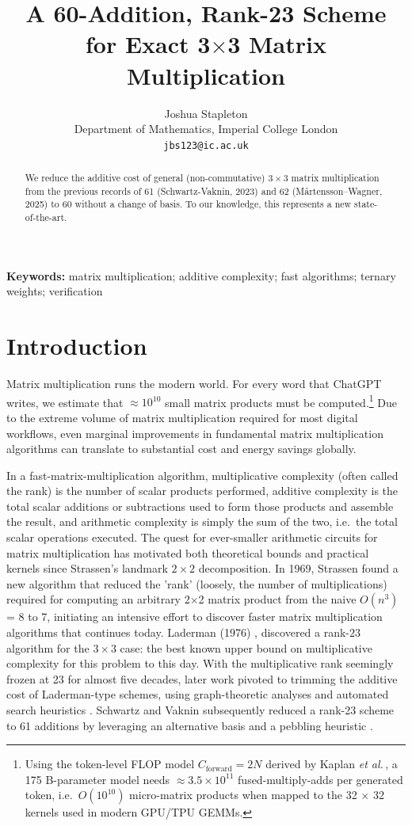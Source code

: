 \documentclass[11pt]{article}
\title{A 60-Addition, Rank-23 Scheme for Exact 3$\times$3 Matrix Multiplication}
\author{%
  Joshua Stapleton\\[-3pt]
  Department of Mathematics, Imperial College London\\
  \texttt{jbs123@ic.ac.uk}}
\providecommand{\keywords}[1]{\textbf{Keywords:} #1}
\begin{document}
\maketitle
\begin{abstract}
We reduce the additive cost of general (non-commutative) $3\times3$ matrix multiplication from the previous records of 61 (Schwartz-Vaknin, 2023) \citep{schwartz2023} and 62 (Mårtensson–Wagner, 2025) \citep{martensson2024} to $60$ without a change of basis. To our knowledge, this represents a new state-of-the-art.
\end{abstract}

\keywords{matrix multiplication; additive complexity; fast algorithms;
ternary weights; verification}

\section{Introduction}
Matrix multiplication runs the modern world. For every word that ChatGPT writes, we estimate that $\approx10^{10}$ small matrix products must be computed.\footnote{Using the token-level FLOP model
$C_{\text{forward}} = 2N$ derived by Kaplan
\textit{et al.}\,\cite{kaplan2020scaling}, a 175 B-parameter model
needs $\approx 3.5\times10^{11}$ fused-multiply-adds per generated
token, i.e.\ $O(10^{10})$ micro-matrix products when mapped to the
32 $\times$ 32 kernels used in modern GPU/TPU GEMMs.} Due to the extreme volume of matrix multiplication required for most digital workflows, even marginal improvements in fundamental matrix multiplication algorithms can translate to substantial cost and energy savings globally. 

In a fast-matrix-multiplication algorithm, multiplicative complexity (often called the rank) is the number of scalar products performed, additive complexity is the total scalar additions or subtractions used to form those products and assemble the result, and arithmetic complexity is simply the sum of the two, i.e.\ the total scalar operations executed. The quest for ever-smaller arithmetic circuits for matrix multiplication has motivated both theoretical bounds and practical kernels since Strassen’s landmark $2\times2$ decomposition. In 1969, Strassen \citep{strassen1969} found a new algorithm that reduced the 'rank' (loosely, the number of multiplications) required for computing an arbitrary 2$\times$2 matrix product from the naive $O(n^3)$ = 8 to 7, initiating an intensive effort to discover faster matrix multiplication algorithms that continues today. Laderman (1976) \cite{laderman1976}, discovered a rank-$23$ algorithm for the $3\times3$ case: the best known upper bound on multiplicative complexity for this problem to this day. With the multiplicative rank seemingly frozen at 23 for almost five decades, later work pivoted to trimming the additive cost of Laderman-type schemes, using graph-theoretic analyses and automated search heuristics \citep{blaser2003,heule2019,martensson2024}. Schwartz and Vaknin subsequently reduced a rank-23 scheme to 61 additions by leveraging an alternative basis and a pebbling heuristic \citep{schwartz2023}.
\end{document}
